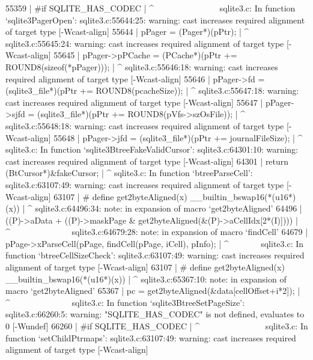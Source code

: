 {{{{{55359 | #if SQLITE_HAS_CODEC
      |     ^~~~~~~~~~~~~~~~
sqlite3.c: In function ‘sqlite3PagerOpen’:
sqlite3.c:55644:25: warning: cast increases required alignment of target type [-Wcast-align]
55644 |   pPager =              (Pager*)(pPtr);
      |                         ^
sqlite3.c:55645:24: warning: cast increases required alignment of target type [-Wcast-align]
55645 |   pPager->pPCache =    (PCache*)(pPtr += ROUND8(sizeof(*pPager)));
      |                        ^
sqlite3.c:55646:18: warning: cast increases required alignment of target type [-Wcast-align]
55646 |   pPager->fd =   (sqlite3_file*)(pPtr += ROUND8(pcacheSize));
      |                  ^
sqlite3.c:55647:18: warning: cast increases required alignment of target type [-Wcast-align]
55647 |   pPager->sjfd = (sqlite3_file*)(pPtr += ROUND8(pVfs->szOsFile));
      |                  ^
sqlite3.c:55648:18: warning: cast increases required alignment of target type [-Wcast-align]
55648 |   pPager->jfd =  (sqlite3_file*)(pPtr += journalFileSize);
      |                  ^
sqlite3.c: In function ‘sqlite3BtreeFakeValidCursor’:
sqlite3.c:64301:10: warning: cast increases required alignment of target type [-Wcast-align]
64301 |   return (BtCursor*)&fakeCursor;
      |          ^
sqlite3.c: In function ‘btreeParseCell’:
sqlite3.c:63107:49: warning: cast increases required alignment of target type [-Wcast-align]
63107 | # define get2byteAligned(x)  __builtin_bswap16(*(u16*)(x))
      |                                                 ^
sqlite3.c:64496:34: note: in expansion of macro ‘get2byteAligned’
64496 |   ((P)->aData + ((P)->maskPage & get2byteAligned(&(P)->aCellIdx[2*(I)])))
      |                                  ^~~~~~~~~~~~~~~
sqlite3.c:64679:28: note: in expansion of macro ‘findCell’
64679 |   pPage->xParseCell(pPage, findCell(pPage, iCell), pInfo);
      |                            ^~~~~~~~
sqlite3.c: In function ‘btreeCellSizeCheck’:
sqlite3.c:63107:49: warning: cast increases required alignment of target type [-Wcast-align]
63107 | # define get2byteAligned(x)  __builtin_bswap16(*(u16*)(x))
      |                                                 ^
sqlite3.c:65367:10: note: in expansion of macro ‘get2byteAligned’
65367 |     pc = get2byteAligned(&data[cellOffset+i*2]);
      |          ^~~~~~~~~~~~~~~
sqlite3.c: In function ‘sqlite3BtreeSetPageSize’:
sqlite3.c:66260:5: warning: "SQLITE_HAS_CODEC" is not defined, evaluates to 0 [-Wundef]
66260 | #if SQLITE_HAS_CODEC
      |     ^~~~~~~~~~~~~~~~
sqlite3.c: In function ‘setChildPtrmaps’:
sqlite3.c:63107:49: warning: cast increases required alignment of target type [-Wcast-align]
}}}}}
